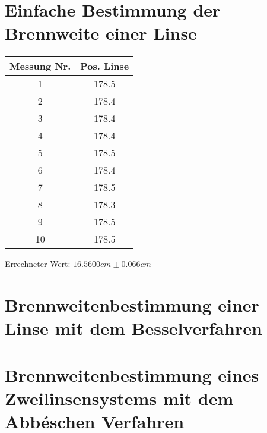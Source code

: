 \section{Einfache Bestimmung der Brennweite einer Linse}

\begin{tabular}{|c|c|}
	\hline
	Messung Nr. & Pos. Linse \\
	\hline
	1 & 178.5 \\
	\hline
	2 & 178.4 \\
	\hline
	3 & 178.4 \\
	\hline
	4 & 178.4 \\
	\hline
	5 & 178.5 \\
	\hline
	6 & 178.4 \\
	\hline
	7 & 178.5 \\
	\hline
	8 & 178.3 \\
	\hline
	9 & 178.5 \\
	\hline
	10 & 178.5 \\
	\hline
\end{tabular}

Errechneter Wert: $16.5600cm \pm 0.066cm$ 

\section{Brennweitenbestimmung einer Linse mit dem Besselverfahren}
\section{Brennweitenbestimmung eines Zweilinsensystems mit dem Abbéschen Verfahren}